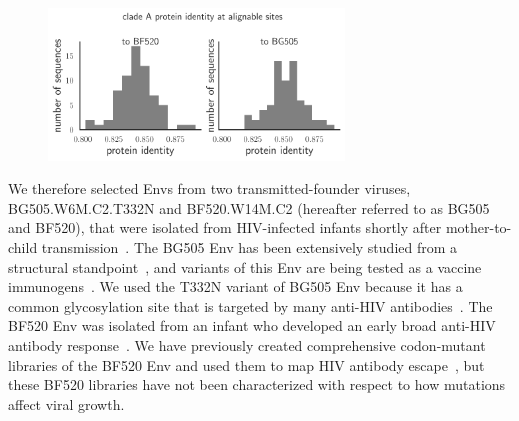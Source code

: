 \documentclass[9pt]{elife}
\begin{document}
\begin{figure}
{}
{\includegraphics[width=0.7\textwidth]{figures/masked_alignment_identity.pdf}}
\end{figure}

We therefore selected Envs from two transmitted-founder viruses, BG505.W6M.C2.T332N and BF520.W14M.C2 (hereafter referred to as BG505 and BF520), that were isolated from HIV-infected infants shortly after mother-to-child transmission~\citep{nduati2000effect,wu2006neutralization,goo2014early}.
The BG505 Env has been extensively studied from a structural standpoint~\citep{julien2013crystal,lyumkis2013cryo,pancera2014structure,huang2014broad,sanders2015hiv,stewart2016trimeric}, and variants of this Env are being tested as a vaccine immunogens~\citep{sanders2013next,sanders2015hiv,de2015immunogenicity}.
We used the T332N variant of BG505 Env because it has a common glycosylation site that is targeted by many anti-HIV antibodies~\citep{sanders2013next}.
The BF520 Env was isolated from an infant who developed an early broad anti-HIV antibody response~\citep{goo2014early,simonich2016hiv}.
We have previously created comprehensive codon-mutant libraries of the BF520 Env and used them to map HIV antibody escape~\citep{dingens2017comprehensive}, but these BF520 libraries have not been characterized with respect to how mutations affect viral growth.
\end{document}
